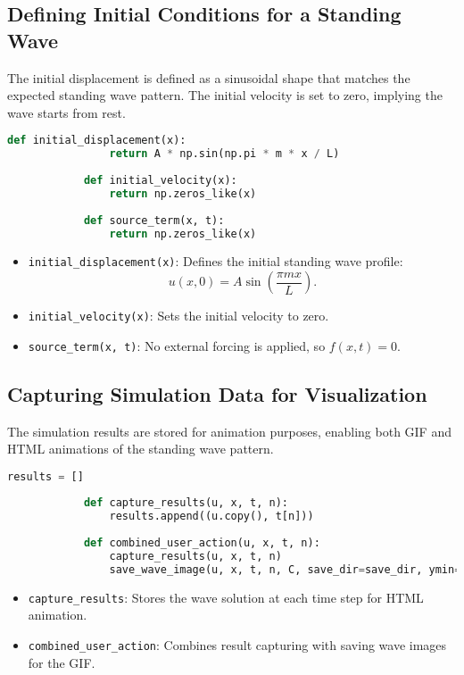 \documentclass{article}
\begin{document}
		 \subsection{Defining Initial Conditions for a Standing Wave}
		 
		 The initial displacement is defined as a sinusoidal shape that matches the expected standing wave pattern. The initial velocity is set to zero, implying the wave starts from rest.
		 
		 \begin{lstlisting}[language=Python]
		 	def initial_displacement(x):
		 		return A * np.sin(np.pi * m * x / L)
		 	
		 	def initial_velocity(x):
		 		return np.zeros_like(x)
		 	
		 	def source_term(x, t):
		 		return np.zeros_like(x)
		 \end{lstlisting}
		 
		 \begin{itemize}
		 	\item \texttt{initial\_displacement(x)}: Defines the initial standing wave profile:
		 	\[
		 	u(x, 0) = A \sin\left(\frac{\pi m x}{L}\right).
		 	\]
		 	\item \texttt{initial\_velocity(x)}: Sets the initial velocity to zero.
		 	\item \texttt{source\_term(x, t)}: No external forcing is applied, so \( f(x, t) = 0 \).
		 \end{itemize}
		 
		 \subsection{Capturing Simulation Data for Visualization}
		 
		 The simulation results are stored for animation purposes, enabling both GIF and HTML animations of the standing wave pattern.
		 
		 \begin{lstlisting}[language=Python]
		 	results = []
		 	
		 	def capture_results(u, x, t, n):
		 		results.append((u.copy(), t[n]))
		 	
		 	def combined_user_action(u, x, t, n):
			 	capture_results(u, x, t, n)
			 	save_wave_image(u, x, t, n, C, save_dir=save_dir, ymin=-A, ymax=A)
		 \end{lstlisting}
		 
		 \begin{itemize}
		 	\item \texttt{capture\_results}: Stores the wave solution at each time step for HTML animation.
		 	\item \texttt{combined\_user\_action}: Combines result capturing with saving wave images for the GIF.
		 \end{itemize}
		 
\end{document}
